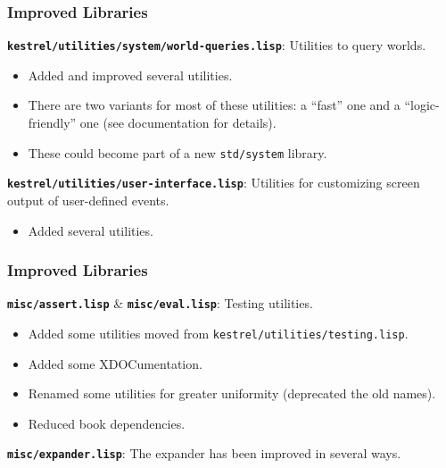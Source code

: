 \documentclass{beamer}
\newcommand{\code}[1]{\texttt{#1}}
\newcommand{\bookpath}[1]{\textbf{\code{#1}}}
\newcommand{\implibtitle}{\frametitle{Improved Libraries}}
\newcommand{\separation}{\vspace*{1ex}}
\begin{document}

\begin{frame}

\implibtitle

\bookpath{kestrel/utilities/system/world-queries.lisp}:
Utilities to query worlds.
\begin{itemize}
\item
Added and improved several utilities.
\item
There are two variants for most of these utilities:
a ``fast'' one and a ``logic-friendly'' one
(see documentation for details).
\item
These could become part of a new \code{std/system} library.
\end{itemize}

\separation

\bookpath{kestrel/utilities/user-interface.lisp}:
Utilities for customizing screen output of user-defined events.
\begin{itemize}
\item
Added several utilities.
\end{itemize}

\end{frame}


\begin{frame}

\implibtitle

\bookpath{misc/assert.lisp} \& \bookpath{misc/eval.lisp}:
Testing utilities.
\begin{itemize}
\item
Added some utilities moved from \code{kestrel/utilities/testing.lisp}.
\item
Added some XDOCumentation.
\item
Renamed some utilities for greater uniformity
(deprecated the old names).
\item
Reduced book dependencies.
\end{itemize}

\separation

\bookpath{misc/expander.lisp}:
The expander has been improved in several ways.

\end{frame}

\end{document}
